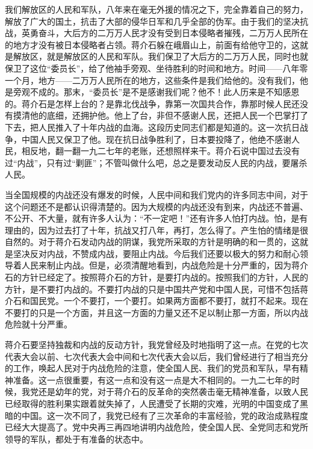我们解放区的人民和军队，八年来在毫无外援的情况之下，完全靠着自己的努力，解放了广大的国土，抗击了大部的侵华日军和几乎全部的伪军。由于我们的坚决抗战，英勇奋斗，大后方的二万万人民才没有受到日本侵略者摧残，二万万人民所在的地方才没有被日本侵略者占领。蒋介石躲在峨眉山上，前面有给他守卫的，这就是解放区，就是解放区的人民和军队。我们保卫了大后方的二万万人民，同时也就保卫了这位“委员长”，给了他袖手旁观、坐待胜利的时间和地方。时间——八年零一个月，地方——二万万人民所在的地方，这些条件是我们给他的。没有我们，他是旁观不成的。那末，“委员长”是不是感谢我们呢？他不！此人历来是不知感恩的。蒋介石是怎样上台的？是靠北伐战争，靠第一次国共合作，靠那时候人民还没有摸清他的底细，还拥护他。他上了台，非但不感谢人民，还把人民一个巴掌打了下去，把人民推入了十年内战的血海。这段历史同志们都是知道的。这一次抗日战争，中国人民又保卫了他。现在抗日战争胜利了，日本要投降了，他绝不感谢人民，相反地，翻一翻一九二七年的老账，还想照样来干。蒋介石说中国过去没有过“内战”，只有过“剿匪”；不管叫做什么吧，总之是要发动反人民的内战，要屠杀人民。

当全国规模的内战还没有爆发的时候，人民中间和我们党内的许多同志中间，对于这个问题还不是都认识得清楚的。因为大规模的内战还没有到来，内战还不普遍、不公开、不大量，就有许多人认为：“不一定吧！”还有许多人怕打内战。怕，是有理由的，因为过去打了十年，抗战又打八年，再打，怎么得了。产生怕的情绪是很自然的。对于蒋介石发动内战的阴谋，我党所采取的方针是明确的和一贯的，这就是坚决反对内战，不赞成内战，要阻止内战。今后我们还要以极大的努力和耐心领导着人民来制止内战。但是，必须清醒地看到，内战危险是十分严重的，因为蒋介石的方针已经定了。按照蒋介石的方针，是要打内战的。按照我们的方针，人民的方针，是不要打内战的。不要打内战的只是中国共产党和中国人民，可惜不包括蒋介石和国民党。一个不要打，一个要打。如果两方面都不要打，就打不起来。现在不要打的只是一个方面，并且这一方面的力量又还不足以制止那一方面，所以内战危险就十分严重。

蒋介石要坚持独裁和内战的反动方针，我党曾经及时地指明了这一点。在党的七次代表大会以前、七次代表大会中间和七次代表大会以后，我们曾经进行了相当充分的工作，唤起人民对于内战危险的注意，使全国人民、我们的党员和军队，早有精神准备。这一点很重要，有这一点和没有这一点是大不相同的。一九二七年的时候，我党还是幼年的党，对于蒋介石的反革命的突然袭击毫无精神准备，以致人民已经取得的胜利果实跟着就失掉了，人民遭受了长期的灾难，光明的中国变成了黑暗的中国。这一次不同了，我党已经有了三次革命的丰富经验，党的政治成熟程度已经大大提高了。党中央再三再四地讲明内战危险，使全国人民、全党同志和党所领导的军队，都处于有准备的状态中。

